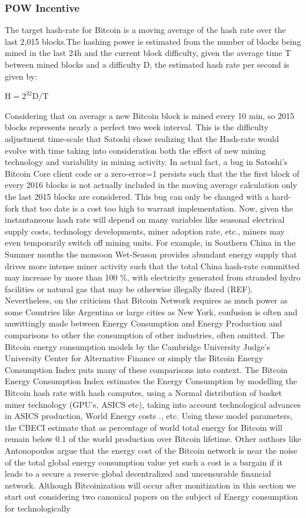 \documentclass[final,5p,times,twocolumn,authoryear]{elsarticle}
\begin{document}
\subsubsection{POW Incentive}
The target hash-rate for Bitcoin is a moving average of the hash rate over the last 2,015 blocks.The hashing power is estimated from the number of blocks being mined in the last 24h and the current block difficulty, given the average time T between mined blocks and a difficulty D, the estimated hash rate per second is given by:

$\textrm{H} = 2^{32} \textrm{D} / \textrm{T}$

Considering that on average a new Bitcoin block is mined every 10 min, so 2015 blocks represents nearly a perfect two week interval. This is the difficulty adjustment time-scale that Satoshi chose realizing that the Hash-rate would evolve with time taking into consideration both the effect of new mining technology and variability in mining activity. In actual fact, a bug in Satoshi's Bitcoin Core client code or a zero-error=1 persists such that the the first block of every 2016 blocks is not actually included in the moving average calculation only the last 2015 blocks are considered. This bug can only be changed with a hard-fork that too date is a cost too high to warrant implementation. Now, given the instantaneous hash rate will depend on many variables like seasonal electrical supply costs, technology developments, miner adoption rate, etc., miners may even temporarily switch off mining units. For example, in Southern China in the Summer months the monsoon Wet-Season provides abundant energy supply that drives more intense miner activity such that the total China hash-rate committed may increase by more than 100 \%, with electricity generated from stranded hydro facilities or natural gas that may be otherwise illegally flared (REF). Nevertheless, on the criticism that Bitcoin Network requires as much power as some Countries like Argentina or large cities as New York, confusion is often and unwittingly made between Energy Consumption and Energy Production and comparisons to other the consumption of other industries, often omitted. The Bitcoin energy consumption models by the Cambridge University Judge's University Center for Alternative Finance or simply the Bitcoin Energy Consumption Index puts many of these comparisons into context. The Bitcoin Energy Consumption Index estimates the Energy Consumption by modelling the Bitcoin hash rate with hash computes, using a Normal distribution of basket miner technology (GPU's, ASICS etc), taking into account technological advances in ASICS production, World Energy costs ., etc. Using these model parameters, the CBECI estimate that as percentage of world total energy for Bitcoin will remain below 0.1 \percent of the world production over Bitcoin lifetime. Other authors like Antonopoulos argue that the energy cost of the Bitcoin network is near the noise of the total global energy consumption value yet such a cost is a bargain if it leads to a secure a reserve global decentralized and uncensurable financial network. Although Bitcoinization will occur after monitization in this section we start out considering two canonical papers on the subject of Energy consumption for technologically 
\end{document}
